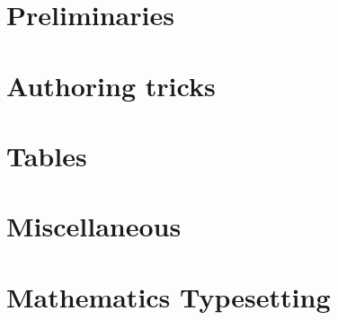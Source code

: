\documentclass[oneside]{book}
\begin{document}
	
	\tableofcontents
	
	\chapter{Preliminaries}
	
	
	
	\chapter{Authoring tricks}
	
	
	
	
	
	\chapter{Tables}
	
	
	\chapter{Miscellaneous}	
	
	
	\chapter{Mathematics Typesetting}
	
	
	
\end{document}
